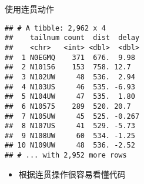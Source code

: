 \documentclass[
]{article}
\newenvironment{Shaded}{\begin{snugshade}}{\end{snugshade}}
\newcommand{\DataTypeTok}[1]{\textcolor[rgb]{0.13,0.29,0.53}{#1}}
\newcommand{\DecValTok}[1]{\textcolor[rgb]{0.00,0.00,0.81}{#1}}
\newcommand{\KeywordTok}[1]{\textcolor[rgb]{0.13,0.29,0.53}{\textbf{#1}}}
\newcommand{\NormalTok}[1]{#1}
\newcommand{\OperatorTok}[1]{\textcolor[rgb]{0.81,0.36,0.00}{\textbf{#1}}}
\newcommand{\OtherTok}[1]{\textcolor[rgb]{0.56,0.35,0.01}{#1}}
\newcommand{\StringTok}[1]{\textcolor[rgb]{0.31,0.60,0.02}{#1}}
\providecommand{\tightlist}{%
  \setlength{\itemsep}{0pt}\setlength{\parskip}{0pt}}
\begin{document}
使用连贯动作

\begin{Shaded}
\end{Shaded}

\begin{verbatim}
## # A tibble: 2,962 x 4
##    tailnum count  dist  delay
##    <chr>   <int> <dbl>  <dbl>
##  1 N0EGMQ    371  676.  9.98 
##  2 N10156    153  758. 12.7  
##  3 N102UW     48  536.  2.94 
##  4 N103US     46  535. -6.93 
##  5 N104UW     47  535.  1.80 
##  6 N10575    289  520. 20.7  
##  7 N105UW     45  525. -0.267
##  8 N107US     41  529. -5.73 
##  9 N108UW     60  534. -1.25 
## 10 N109UW     48  536. -2.52 
## # ... with 2,952 more rows
\end{verbatim}

\begin{itemize}
\tightlist
\item
  根据连贯操作很容易看懂代码
\end{itemize}

\begin{Shaded}
\end{Shaded}
\end{document}
